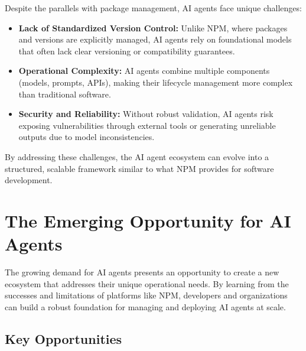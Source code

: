 \documentclass[12pt,twocolumn]{article}
\begin{document}
Despite the parallels with package management, AI agents face unique challenges:

\begin{itemize}
    \item \textbf{Lack of Standardized Version Control:} Unlike NPM, where packages and versions are explicitly managed, AI agents rely on foundational models that often lack clear versioning or compatibility guarantees.
    \item \textbf{Operational Complexity:} AI agents combine multiple components (models, prompts, APIs), making their lifecycle management more complex than traditional software.
    \item \textbf{Security and Reliability:} Without robust validation, AI agents risk exposing vulnerabilities through external tools or generating unreliable outputs due to model inconsistencies.
\end{itemize}

By addressing these challenges, the AI agent ecosystem can evolve into a structured, scalable framework similar to what NPM provides for software development.

\section{The Emerging Opportunity for AI Agents}

The growing demand for AI agents presents an opportunity to create a new ecosystem that addresses their unique operational needs. By learning from the successes and limitations of platforms like NPM, developers and organizations can build a robust foundation for managing and deploying AI agents at scale.

\subsection{Key Opportunities}
\end{document}
